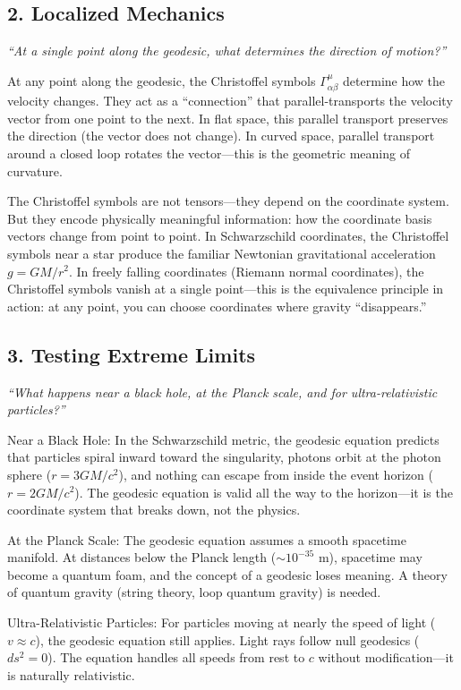 \subsection*{2. Localized Mechanics}
\textit{``At a single point along the geodesic, what determines the direction of motion?''}

At any point along the geodesic, the Christoffel symbols $\Gamma^\mu_{\alpha\beta}$ determine how the velocity changes. They act as a ``connection'' that parallel-transports the velocity vector from one point to the next. In flat space, this parallel transport preserves the direction (the vector does not change). In curved space, parallel transport around a closed loop rotates the vector---this is the geometric meaning of curvature.

The Christoffel symbols are not tensors---they depend on the coordinate system. But they encode physically meaningful information: how the coordinate basis vectors change from point to point. In Schwarzschild coordinates, the Christoffel symbols near a star produce the familiar Newtonian gravitational acceleration $g = GM/r^2$. In freely falling coordinates (Riemann normal coordinates), the Christoffel symbols vanish at a single point---this is the equivalence principle in action: at any point, you can choose coordinates where gravity ``disappears.''

\subsection*{3. Testing Extreme Limits}
\textit{``What happens near a black hole, at the Planck scale, and for ultra-relativistic particles?''}

Near a Black Hole: In the Schwarzschild metric, the geodesic equation predicts that particles spiral inward toward the singularity, photons orbit at the photon sphere ($r = 3GM/c^2$), and nothing can escape from inside the event horizon ($r = 2GM/c^2$). The geodesic equation is valid all the way to the horizon---it is the coordinate system that breaks down, not the physics.

At the Planck Scale: The geodesic equation assumes a smooth spacetime manifold. At distances below the Planck length ($\sim 10^{-35}$ m), spacetime may become a quantum foam, and the concept of a geodesic loses meaning. A theory of quantum gravity (string theory, loop quantum gravity) is needed.

Ultra-Relativistic Particles: For particles moving at nearly the speed of light ($v \approx c$), the geodesic equation still applies. Light rays follow null geodesics ($ds^2 = 0$). The equation handles all speeds from rest to $c$ without modification---it is naturally relativistic.

